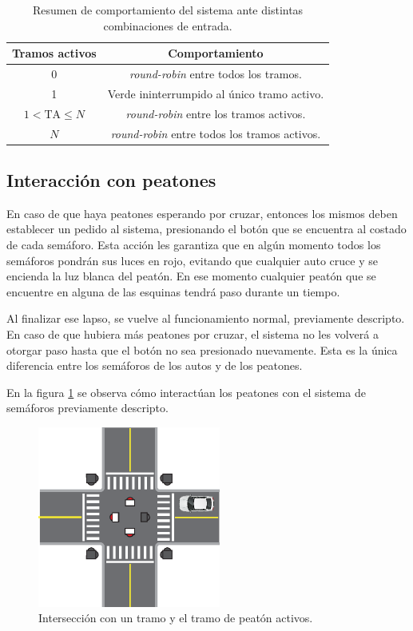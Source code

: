 		\begin{table}[htbp]
			\centering
			\caption{Resumen de comportamiento del sistema ante distintas combinaciones de entrada.}
			\vspace{0.25cm}
			\label{tab:comportamiento}
			\begin{tabular}{cc}
				\toprule
				\bf{Tramos activos} & \bf{Comportamiento} \\
				\midrule
				0 & \emph{round-robin} entre todos los tramos. \\
				1 & Verde ininterrumpido al único tramo activo. \\
				$1 < \mbox{TA} \le N$ & \emph{round-robin} entre los tramos activos. \\
				$N$ & \emph{round-robin} entre todos los tramos activos. \\
				\bottomrule
			\end{tabular}
		\end{table}



	\subsection{Interacción con peatones}

		En caso de que haya peatones esperando por cruzar, entonces los mismos deben establecer un pedido al sistema, presionando el botón que se encuentra al costado de cada semáforo.
		Esta acción les garantiza que en algún momento todos los semáforos pondrán sus luces en rojo, evitando que cualquier auto cruce y se encienda la luz blanca del peatón.
		En ese momento cualquier peatón que se encuentre en alguna de las esquinas tendrá paso durante un tiempo.

		Al finalizar ese lapso, se vuelve al funcionamiento normal, previamente descripto.
		En caso de que hubiera más peatones por cruzar, el sistema no les volverá a otorgar paso hasta que el botón no sea presionado nuevamente.
		Esta es la única diferencia entre los semáforos de los autos y de los peatones.

		En la figura \ref{fig:peaton-activo} se observa cómo interactúan los peatones con el sistema de semáforos previamente descripto.

		\begin{figure}[htbp]
			\centering
			\includegraphics[width=6cm]{imagenes/peaton-auto.eps}
			\caption{Intersección con un tramo y el tramo de peatón activos.}
			\label{fig:peaton-activo}
		\end{figure}



